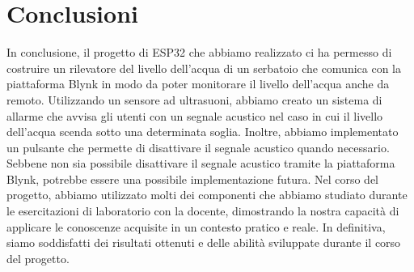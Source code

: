 \section{Conclusioni}

In conclusione, il progetto di ESP32 che abbiamo realizzato ci ha permesso di costruire un rilevatore del livello dell'acqua di un serbatoio che comunica con la piattaforma Blynk in modo da poter monitorare il livello dell'acqua anche da remoto. Utilizzando un sensore ad ultrasuoni, abbiamo creato un sistema di allarme che avvisa gli utenti con un segnale acustico nel caso in cui il livello dell'acqua scenda sotto una determinata soglia. Inoltre, abbiamo implementato un pulsante che permette di disattivare il segnale acustico quando necessario. Sebbene non sia possibile disattivare il segnale acustico tramite la piattaforma Blynk, potrebbe essere una possibile implementazione futura. Nel corso del progetto, abbiamo utilizzato molti dei componenti che abbiamo studiato durante le esercitazioni di laboratorio con la docente, dimostrando la nostra capacità di applicare le conoscenze acquisite in un contesto pratico e reale. In definitiva, siamo soddisfatti dei risultati ottenuti e delle abilità sviluppate durante il corso del progetto.